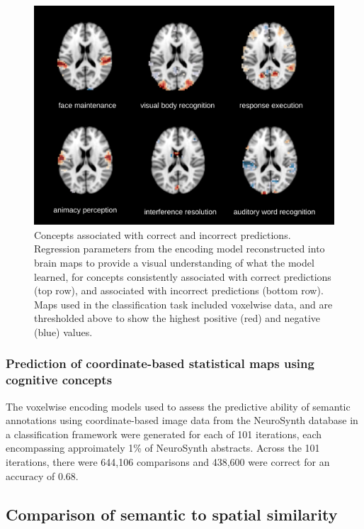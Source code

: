 \documentclass{report}
\begin{document}
\begin{figure}[h!]
\begin{center}
\includegraphics[width=15cm]{images/figure32.png}
\end{center}
 \caption{\label{fig:32} Concepts associated with correct and incorrect predictions.
Regression parameters from the encoding model reconstructed into brain
maps to provide a visual understanding of what the model learned, for
concepts consistently associated with correct predictions (top row), and
associated with incorrect predictions (bottom row). Maps used in the
classification task included voxelwise data, and are thresholded above
to show the highest positive (red) and negative (blue) values.}
\end{figure}

\subsubsection{Prediction of coordinate-based statistical maps using cognitive concepts}
The voxelwise encoding models used to assess the predictive ability of
semantic annotations using coordinate-based image data from the NeuroSynth database in a classification framework were generated for each of 101 iterations, each encompassing approimately 1\% of NeuroSynth abstracts. Across the 101 iterations, there were 644,106 comparisons and 438,600 were correct for an accuracy of 0.68.


\subsection{Comparison of semantic to spatial similarity}
\end{document}
